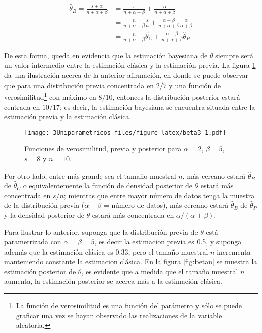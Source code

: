 \documentclass[
  12pt,
  spanish,
]{book}
\theoremstyle{definition}
\theoremstyle{definition}
\theoremstyle{definition}
\theoremstyle{definition}
\theoremstyle{remark}
\begin{document}
\begin{align*}
\hat{\theta}_{B}=\frac{s+\alpha}{n+\alpha+\beta}&=\frac{s}{n+\alpha+\beta}+\frac{\alpha}{n+\alpha+\beta}\\
&=\frac{n}{n+\alpha+\beta}\frac{s}{n}+\frac{\alpha+\beta}{n+\alpha+\beta}\frac{\alpha}{\alpha+\beta}\\
&=\frac{n}{n+\alpha+\beta}\hat{\theta}_{C}+\frac{\alpha+\beta}{n+\alpha+\beta}\hat{\theta}_{P}
\end{align*}

De esta forma, queda en evidencia que la estimación bayesiana de
\(\theta\) siempre será un valor intermedio entre la estimación clásica y
la estimación previa. La figura \ref{fig:beta3} da una ilustración
acerca de la anterior afirmación, en donde se puede observar que para
una distribución previa concentrada en \(2/7\) y una función de
verosimilitud\footnote{La función de verosimilitud es una función del parámetro
  y sólo se puede graficar una vez se hayan observado las realizaciones de
  la variable aleatoria.} con máximo en \(8/10\), entonces la distribución
posterior estará centrada en \(10/17\); es decir, la estimación bayesiana
se encuentra situada entre la estimación previa y la estimación clásica.

\begin{figure}
\centering
\texttt{[image: 3Uniparametricos\_files/figure-latex/beta3-1.pdf]}
\caption{\label{fig:beta3}Funciones de verosimilitud, previa y posterior para \(\alpha=2\), \(\beta=5\), \(s=8\) y \(n=10\).}
\end{figure}

Por otro lado, entre más grande sea el tamaño muestral \(n\), más
cercano estará \(\hat{\theta}_{B}\) de \(\hat{\theta}_{C}\) o
equivalentemente la función de densidad posterior de \(\theta\) estará más
concentrada en \(s/n\); mientras que entre mayor número de datos tenga la
muestra de la distribución previa (\(\alpha+\beta\) = número de datos), más
cercano estará \(\hat{\theta}_{B}\) de \(\hat{\theta}_{P}\) y la densidad
posterior de \(\theta\) estará más concentrada en \(\alpha/(\alpha+\beta)\).

Para ilustrar lo anterior, suponga que la distribución previa de
\(\theta\) está parametrizada con \(\alpha=\beta=5\), es decir la estimacion previa es 0.5, y suponga además que la estimación clásica es 0.33, pero el tamaño muestral \(n\) incrementa manteniendo constante la estimacion
clásica. En la figura \ref{fig:betan} se muestra la estimación posterior de
\(\theta\), es evidente que a medida que el tamaño muestral \(n\) aumenta,
la estimación posterior se acerca más a la estimación clásica.
\end{document}
